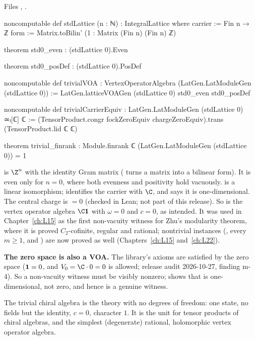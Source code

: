 \noindent Files , .
\begin{leancode}
noncomputable def stdLattice (n : ℕ) : IntegralLattice where
  carrier := Fin n → ℤ
  form := Matrix.toBilin' (1 : Matrix (Fin n) (Fin n) ℤ)

theorem std0_even : (stdLattice 0).Even

theorem std0_posDef : (stdLattice 0).PosDef

noncomputable def trivialVOA : VertexOperatorAlgebra (LatGen.LatModuleGen (stdLattice 0)) :=
  LatGen.latticeVOAGen (stdLattice 0) std0_even std0_posDef

noncomputable def trivialCarrierEquiv : LatGen.LatModuleGen (stdLattice 0) ≃ₗ[ℂ] ℂ :=
  (TensorProduct.congr fockZeroEquiv chargeZeroEquiv).trans (TensorProduct.lid ℂ ℂ)

theorem trivial_finrank : Module.finrank ℂ (LatGen.LatModuleGen (stdLattice 0)) = 1
\end{leancode}

\begin{dictionary}
 is $\Z^n$ with the identity Gram matrix ( turns a matrix into a bilinear
form). It is even only for $n=0$, where both evenness and positivity hold vacuously.  is a linear
isomorphism;  identifies the carrier with $\C$, and  says it is
one-dimensional. The central charge is  $=0$ (checked in Lean; not part of this release). So  is the
vertex operator algebra $\C\lfivevac$ with $\omega=0$ and $c=0$, as intended. It was used in Chapter~\ref{ch:L15} as
the first non-vacuity witness for Zhu's modularity theorem, where it is proved $C_2$-cofinite, regular and rational;
nontrivial instances (, every $m\ge1$, and ) are now proved as well
(Chapters~\ref{ch:L15} and~\ref{ch:L22}).

\textbf{The zero space is also a VOA.} The library's axioms are satisfied by the zero space ($\mathbf{1} = 0$, and
$V_0 = \C\cdot0 = 0$ is allowed; release audit 2026-10-27, finding m-4). So a non-vacuity witness must be visibly
nonzero;  shows that  is one-dimensional, not zero, and hence is a genuine witness.
\end{dictionary}

\begin{physics}
The trivial chiral algebra is the theory with no degrees of freedom: one state, no fields but the identity,
$c=0$, character $1$. It is the unit for tensor products of chiral algebras, and the simplest (degenerate)
rational, holomorphic vertex operator algebra.
\end{physics}

